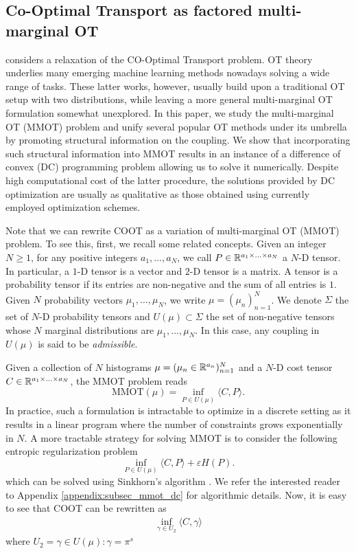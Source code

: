 \subsection{Co-Optimal Transport as factored multi-marginal OT} \label{subsec:MMOT_DC}

considers a relaxation of the
CO-Optimal Transport problem. OT theory underlies many emerging machine learning
methods nowadays solving a wide range of tasks.
These latter works, however, usually build upon a traditional OT setup with two distributions,
while leaving a more general multi-marginal OT formulation somewhat
unexplored. In this paper, we study the multi-marginal OT (MMOT) problem and unify several
popular OT methods under its umbrella
by promoting structural information on the coupling. We show that incorporating such structural
information into MMOT results in an instance of a difference of convex (DC) programming problem allowing us to solve it numerically.
Despite high computational cost of the latter procedure, the solutions provided by DC optimization are usually as qualitative as
those obtained using currently employed optimization schemes.

Note that we can rewrite COOT as a variation of multi-marginal OT (MMOT) problem.
To see this, first, we recall some related concepts.
Given an integer $N \geq 1$, for any positive integers $a_1,..., a_N$, we call
$P \in \mathbb R^{a_1 \times ... \times a_N}$ a $N$-D tensor. In particular,
a $1$-D tensor is a vector and $2$-D tensor is a matrix.
A tensor is a probability tensor if its entries are non-negative and the sum of all entries is $1$.
Given $N$ probability vectors $\mu_1, ..., \mu_N$, we write $\mu = (\mu_n)_{n=1}^N$.
We denote $\Sigma$ the set of $N$-D probability tensors and $U(\mu) \subset \Sigma$ the set of non-negative tensors whose $N$
marginal distributions are $\mu_1, ..., \mu_N$. In this case, any coupling in $U(\mu)$ is said to be \textit{admissible}.

Given a collection of $N$ histograms $\mu = (\mu_n \in \mathbb R^{a_n})_{n=1}^N$
and a $N$-D cost tensor $C \in \mathbb R^{a_1 \times ... \times a_N}$, the MMOT problem reads
\begin{equation}
  \text{MMOT}(\mu) = \inf_{P \in U(\mu)} \langle C, P \rangle.
\end{equation}
In practice, such a formulation is intractable to optimize in a discrete setting as it results in a linear program where the number
of constraints grows exponentially in $N$. A more tractable strategy for solving MMOT is to consider the following entropic
regularization problem
\begin{equation} \label{MMOT_primal}
  \inf_{P \in U(\mu)} \langle C, P \rangle + \varepsilon H(P).
\end{equation}
which can be solved using Sinkhorn's algorithm \citep{Benamou14}.
We refer the interested reader to Appendix \ref{appendix:subsec_mmot_dc} for algorithmic details.
Now, it is easy to see that COOT can be rewritten as
\begin{align}
  \inf_{\gamma \in U_2} \langle C, \gamma \rangle
\end{align}
where $U_2 = {\gamma \in U(\mu): \gamma = \pi^s }$

